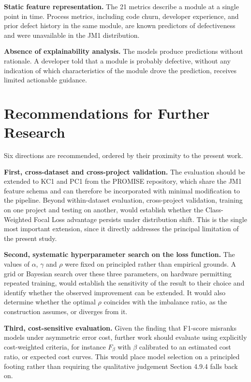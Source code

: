 \documentclass[12pt,a4paper,oneside]{report}
\begin{document}
\textbf{Static feature representation.} The 21 metrics describe a module at a single point in time. Process metrics, including code churn, developer experience, and prior defect history in the same module, are known predictors of defectiveness and were unavailable in the JM1 distribution.

\textbf{Absence of explainability analysis.} The models produce predictions without rationale. A developer told that a module is probably defective, without any indication of which characteristics of the module drove the prediction, receives limited actionable guidance.

\section{Recommendations for Further Research}

Six directions are recommended, ordered by their proximity to the present work.

\textbf{First, cross-dataset and cross-project validation.} The evaluation should be extended to KC1 and PC1 from the PROMISE repository, which share the JM1 feature schema and can therefore be incorporated with minimal modification to the pipeline. Beyond within-dataset evaluation, cross-project validation, training on one project and testing on another, would establish whether the Class-Weighted Focal Loss advantage persists under distribution shift. This is the single most important extension, since it directly addresses the principal limitation of the present study.

\textbf{Second, systematic hyperparameter search on the loss function.} The values of $\alpha$, $\gamma$ and $\rho$ were fixed on principled rather than empirical grounds. A grid or Bayesian search over these three parameters, on hardware permitting repeated training, would establish the sensitivity of the result to their choice and identify whether the observed improvement can be extended. It would also determine whether the optimal $\rho$ coincides with the imbalance ratio, as the construction assumes, or diverges from it.

\textbf{Third, cost-sensitive evaluation.} Given the finding that F1-score misranks models under asymmetric error cost, further work should evaluate using explicitly cost-weighted criteria, for instance $F_\beta$ with $\beta$ calibrated to an estimated cost ratio, or expected cost curves. This would place model selection on a principled footing rather than requiring the qualitative judgement Section 4.9.4 falls back on.
\end{document}

